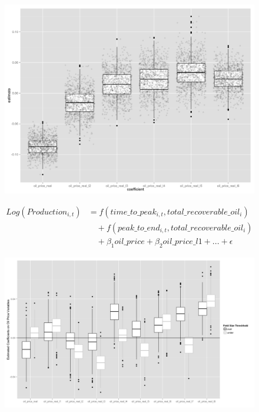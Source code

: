 \documentclass{beamer}
\begin{document}
\begin{frame}[plain]
	\begin{figure}
	\includegraphics[width=.8\textwidth]{figures/glm_dirty_box.png}
	\label{glm_dirty_box}
	\end{figure}
\end{frame}


\begin{frame}[plain]
	\begin{equation}
	\begin{split}
		Log(Production_{i,t})&=f(time\_to\_peak_{i,t}, total\_recoverable\_oil_i) \\
		& \quad + f(peak\_to\_end_{i,t}, total\_recoverable\_oil_i) \\
		& \quad + \beta_1 oil\_price + \beta_2 oil\_price\_l1 + ... +  \epsilon
	\end{split}
	\label{gam_price_eqn}
	\end{equation}
\end{frame}

\begin{figure}
	\includegraphics[width=1\textwidth]{figures/gam_price_8_print.png}
	\label{gam_price_8}
\end{figure}
\end{document}

